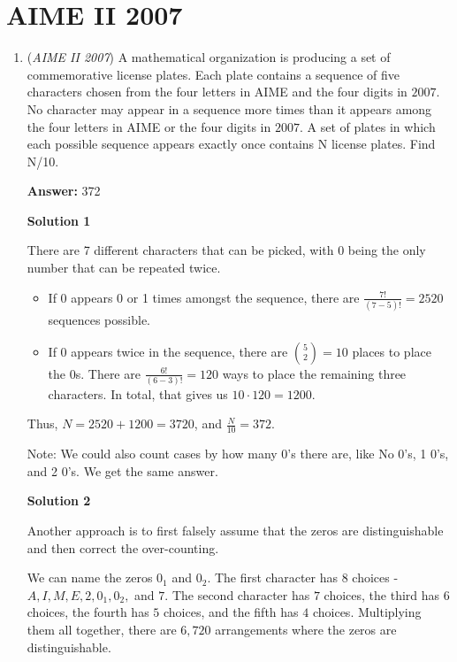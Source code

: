 \section{AIME II 2007}
        \begin{enumerate}
        	\item (\textit{AIME II 2007}) A mathematical organization is producing a set of commemorative license plates. Each plate contains a sequence of five characters chosen from the four letters in AIME and the four digits in $2007$. No character may appear in a sequence more times than it appears among the four letters in AIME or the four digits in $2007$. A set of plates in which each possible sequence appears exactly once contains N license plates. Find N/10.


 
 \textbf{Answer: }372



\textbf{Solution 1}

There are 7 different characters that can be picked, with 0 being the only number that can be repeated twice.

 
            \begin{itemize}
        \item If $0$ appears 0 or 1 times amongst the sequence, there are $\frac{7!}{(7-5)!} = 2520$ sequences possible.
        \item If $0$ appears twice in the sequence, there are ${5\choose2} = 10$ places to place the $0$s. There are $\frac{6!}{(6-3)!} = 120$ ways to place the remaining three characters. In total, that gives us $10 \cdot 120 = 1200$.
            \end{itemize}
            Thus, $N = 2520 + 1200 = 3720$, and $\frac{N}{10} = \boxed{372}$.

 Note: We could also count cases by how many 0's there are, like No 0's, 1 0's, and 2 0's. We get the same answer.

 



\textbf{Solution 2}

Another approach is to first falsely assume that the zeros are distinguishable and then correct the over-counting.

 We can name the zeros $0_1$ and $0_2$. The first character has 8 choices - $A,I,M,E,2,0_1,0_2,$ and $7$. The second character has $7$ choices, the third has $6$ choices, the fourth has $5$ choices, and the fifth has $4$ choices. Multiplying them all together, there are $6,720$ arrangements where the zeros are distinguishable.


\end{enumerate}
